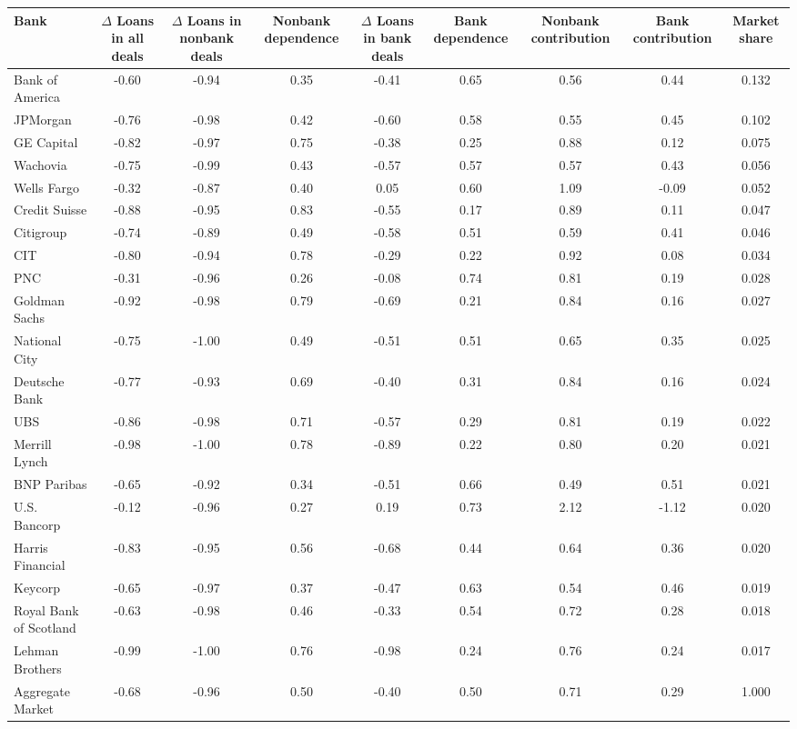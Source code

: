 \begin{tabular}{lcccccccc} \hline\hline
Bank & $\Delta$ Loans in all deals & $\Delta$ Loans in nonbank deals & Nonbank dependence & $\Delta$ Loans in bank deals & Bank dependence & Nonbank contribution & Bank contribution & Market share \\ \hline
Bank of America&-0.60&-0.94&0.35&-0.41&0.65&0.56&0.44&0.132\\
JPMorgan&-0.76&-0.98&0.42&-0.60&0.58&0.55&0.45&0.102\\
GE Capital&-0.82&-0.97&0.75&-0.38&0.25&0.88&0.12&0.075\\
Wachovia&-0.75&-0.99&0.43&-0.57&0.57&0.57&0.43&0.056\\
Wells Fargo&-0.32&-0.87&0.40&0.05&0.60&1.09&-0.09&0.052\\
Credit Suisse&-0.88&-0.95&0.83&-0.55&0.17&0.89&0.11&0.047\\
Citigroup&-0.74&-0.89&0.49&-0.58&0.51&0.59&0.41&0.046\\
CIT&-0.80&-0.94&0.78&-0.29&0.22&0.92&0.08&0.034\\
PNC&-0.31&-0.96&0.26&-0.08&0.74&0.81&0.19&0.028\\
Goldman Sachs&-0.92&-0.98&0.79&-0.69&0.21&0.84&0.16&0.027\\
National City&-0.75&-1.00&0.49&-0.51&0.51&0.65&0.35&0.025\\
Deutsche Bank&-0.77&-0.93&0.69&-0.40&0.31&0.84&0.16&0.024\\
UBS&-0.86&-0.98&0.71&-0.57&0.29&0.81&0.19&0.022\\
Merrill Lynch&-0.98&-1.00&0.78&-0.89&0.22&0.80&0.20&0.021\\
BNP Paribas&-0.65&-0.92&0.34&-0.51&0.66&0.49&0.51&0.021\\
U.S. Bancorp&-0.12&-0.96&0.27&0.19&0.73&2.12&-1.12&0.020\\
Harris Financial&-0.83&-0.95&0.56&-0.68&0.44&0.64&0.36&0.020\\
Keycorp&-0.65&-0.97&0.37&-0.47&0.63&0.54&0.46&0.019\\
Royal Bank of Scotland&-0.63&-0.98&0.46&-0.33&0.54&0.72&0.28&0.018\\
Lehman Brothers&-0.99&-1.00&0.76&-0.98&0.24&0.76&0.24&0.017\\
Aggregate Market&-0.68&-0.96&0.50&-0.40&0.50&0.71&0.29&1.000\\
\hline\hline \end{tabular}

